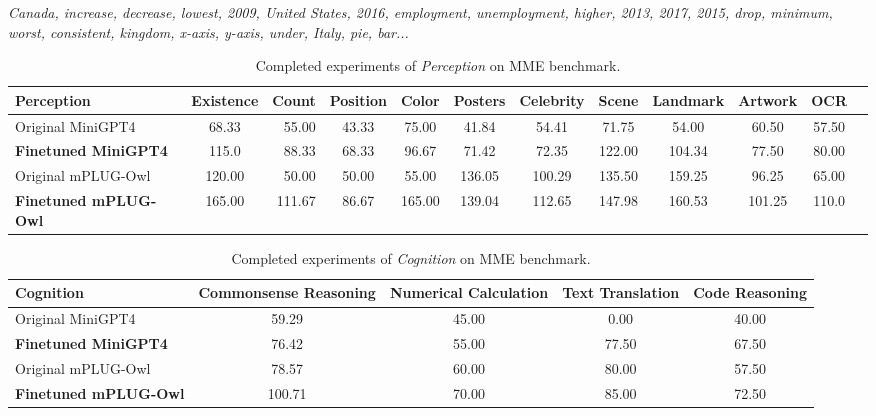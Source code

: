 \textit{Canada, increase, decrease, lowest, 2009, United States, 2016, employment, unemployment, higher, 2013, 2017, 2015, drop, minimum, worst, consistent, kingdom, x-axis, y-axis, under, Italy, pie, bar...}



\begin{table}[t]
\setlength\tabcolsep{1pt}
\centering
\small
\begin{tabular}{lcrccccccccc}
\toprule[1.5pt]
Perception& Existence&Count & Position & Color & Posters & Celebrity& Scene & Landmark & Artwork & OCR\\
\midrule
Original MiniGPT4 & 68.33&55.00&43.33&75.00&41.84&54.41&71.75&54.00&60.50&57.50\\
\textbf{Finetuned MiniGPT4} & 115.0&88.33&68.33&96.67&71.42&72.35&122.00&104.34&77.50&80.00&\\
Original mPLUG-Owl & 120.00&50.00&50.00&55.00&136.05&100.29&135.50&159.25&96.25&65.00\\
\textbf{Finetuned mPLUG-Owl} & 165.00&111.67&86.67&165.00&139.04&112.65&147.98&160.53&101.25& 110.0\\
\midrule
\end{tabular}
\vspace{2mm}
\caption{Completed experiments of \textit{Perception} on MME \cite{fu2023mme} benchmark. }
\label{tab:mme_preception}
\vspace{-0.1in}
\end{table}

\begin{table}[t]
\setlength\tabcolsep{3pt}
\centering
\small
\begin{tabular}{lcccc}
\toprule[1.5pt]
Cognition &Commonsense Reasoning& Numerical Calculation&Text Translation & Code Reasoning\\
\midrule
Original MiniGPT4 & 59.29&45.00&0.00&40.00\\
\textbf{Finetuned MiniGPT4} & 76.42&55.00&77.50&67.50\\
Original mPLUG-Owl & 78.57&60.00&80.00&57.50\\
\textbf{Finetuned mPLUG-Owl} & 100.71&70.00&85.00&72.50\\
\midrule
\end{tabular}
\vspace{2mm}
\caption{Completed experiments of \textit{Cognition} on MME \cite{fu2023mme} benchmark. }
\label{tab:mme_cog}
\vspace{-0.1in}
\end{table}


